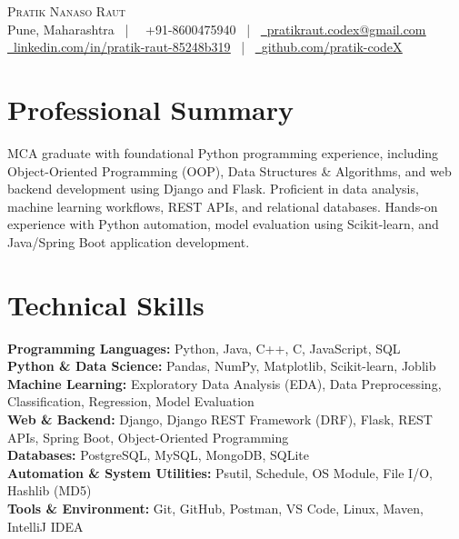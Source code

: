 \documentclass[letterpaper,11pt]{article}
\newcommand{\faPhone}{}
\newcommand{\faEnvelope}{}
\newcommand{\faLinkedin}{}
\newcommand{\faGithub}{}
\begin{document}
\begin{center}
    {\Huge \scshape Pratik Nanaso Raut} \\ \vspace{2pt}
    \small Pune, Maharashtra ~|~ 
    \faPhone\ +91-8600475940 ~|~ 
    \href{mailto:pratikraut.codex@gmail.com}{\faEnvelope\ \underline{pratikraut.codex@gmail.com}} \\ \vspace{2pt}
    \href{https://linkedin.com/in/pratik-raut-85248b319}{\faLinkedin\ \underline{linkedin.com/in/pratik-raut-85248b319}} ~|~ 
    \href{https://github.com/pratik-codeX}{\faGithub\ \underline{github.com/pratik-codeX}}
\end{center}

\section{Professional Summary}
MCA graduate with foundational Python programming experience, including Object-Oriented Programming (OOP), Data Structures \& Algorithms, and web backend development using Django and Flask. Proficient in data analysis, machine learning workflows, REST APIs, and relational databases. Hands-on experience with Python automation, model evaluation using Scikit-learn, and Java/Spring Boot application development.

\section{Technical Skills}
\vspace{1pt}
\textbf{Programming Languages:} Python, Java, C++, C, JavaScript, SQL \\[1.5pt]
\textbf{Python \& Data Science:} Pandas, NumPy, Matplotlib, Scikit-learn, Joblib \\[1.5pt]
\textbf{Machine Learning:} Exploratory Data Analysis (EDA), Data Preprocessing, Classification, Regression, Model Evaluation \\[1.5pt]
\textbf{Web \& Backend:} Django, Django REST Framework (DRF), Flask, REST APIs, Spring Boot, Object-Oriented Programming \\[1.5pt]
\textbf{Databases:} PostgreSQL, MySQL, MongoDB, SQLite \\[1.5pt]
\textbf{Automation \& System Utilities:} Psutil, Schedule, OS Module, File I/O, Hashlib (MD5) \\[1.5pt]
\textbf{Tools \& Environment:} Git, GitHub, Postman, VS Code, Linux, Maven, IntelliJ IDEA
\end{document}
